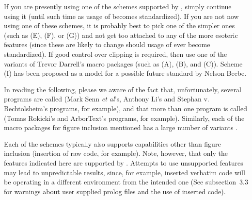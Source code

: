 If you are presently using one of the schemes supported by {\DVIPSONE}, 
simply continue using it
(until such time as usage of \verb@\special@ becomes standardized). 
If you are not now using one of these schemes, 
it is probably best to pick one of the simpler ones
(such as (E), (F), or (G)) %
and not get too attached to any of the more esoteric features
(since these are likely to change should %
usage of \verb@\special@ ever become standardized). %
If good control over clipping is required, then use one of the variants
of Trevor Darrell's {\PSFIG} macro packages (such as (A), (B), and (C)).
Scheme (I) has been proposed as a model for a possible future standard
by Nelson Beebe. %

In reading the following, please we aware of the fact that,
unfortunately, several programs are called {\DVITWOPS} 
(Mark Senn {\it et al}'s, Anthony Li's and Stephan v. Bechtolsheim's programs,
for example),
and that more than one program is called {\DVIPS}
(Tomas Rokicki's and ArborText's programs, for example).
Similarly, each of the %
macro packages for figure inclusion
mentioned has a large number of variants%
.

Each of the schemes typically also supports capabilities other than figure
inclusion (insertion of raw {\PS} code, for example).
Note, however, that only the features indicated here are supported by
{\DVIPSONE}. 
Attempts to use unsupported features may lead to unpredictable results,
since, for example, inserted verbatim {\PS} code will be
operating in a %
different environment from the intended one
(See subsection~3.3 for warnings about user supplied prolog files 
and the use of inserted {\PS} code). 

